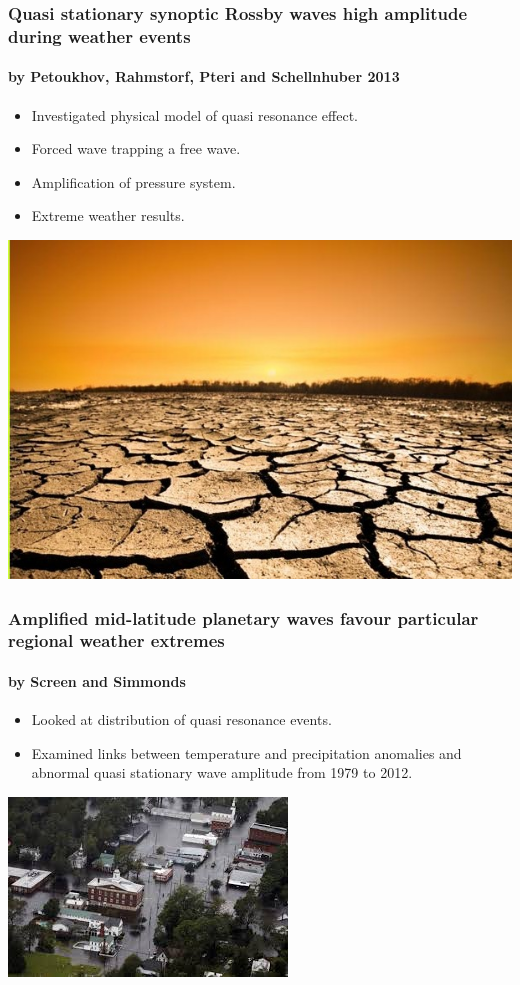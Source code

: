 \documentclass[12pt]{beamer}
\begin{document}
\begin{frame}
\frametitle{Quasi stationary synoptic Rossby waves high amplitude during weather events }
\framesubtitle{by Petoukhov, Rahmstorf, Pteri and Schellnhuber 2013}
\begin{itemize}
	\item Investigated physical model of quasi resonance effect.
	\item Forced wave trapping a free wave.
	\item Amplification of pressure system.
	\item Extreme weather results.
\end{itemize}
\centering\includegraphics[height=0.4\textheight]{drought}

\end{frame}
\begin{frame}
\frametitle{Amplified mid-latitude planetary waves favour particular regional weather extremes}
\framesubtitle{ 
by Screen and Simmonds }
\begin{itemize}
\item Looked at distribution of quasi resonance events.
\item Examined links between temperature and precipitation anomalies and abnormal quasi stationary wave amplitude from 1979 to 2012.

\end{itemize}
\centering\includegraphics[height=0.4\textheight]{flood}
\end{frame}
\end{document}
